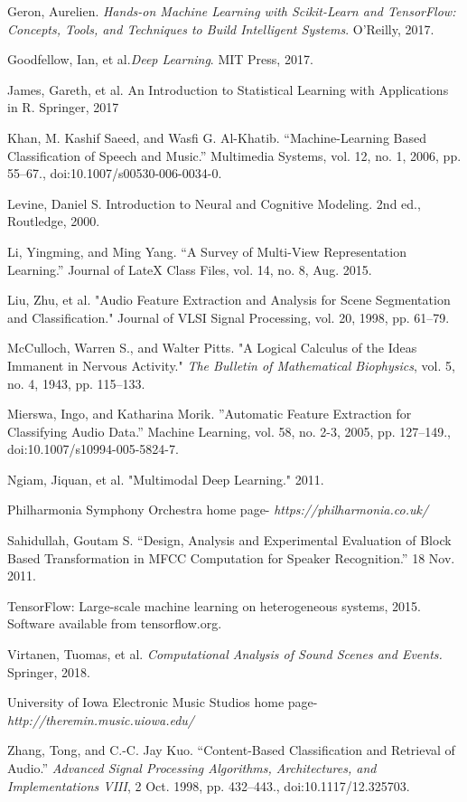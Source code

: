 \documentclass[conference,twocolumn,letterpaper]{IEEEtran}
\begin{document}
\begin{thebibliography}{9}

Geron, Aurelien. \textit{Hands-on Machine Learning with Scikit-Learn and TensorFlow: Concepts, Tools, and Techniques to Build Intelligent Systems}. O'Reilly, 2017.

Goodfellow, Ian, et al.\textit{Deep Learning}. MIT Press, 2017.

James, Gareth, et al. An Introduction to Statistical Learning with Applications in R. Springer, 2017

Khan, M. Kashif Saeed, and Wasfi G. Al-Khatib. “Machine-Learning Based Classification of Speech and Music.” Multimedia Systems, vol. 12, no. 1, 2006, pp. 55–67., doi:10.1007/s00530-006-0034-0.

Levine, Daniel S. Introduction to Neural and Cognitive Modeling. 2nd ed., Routledge, 2000.

Li, Yingming, and Ming Yang. “A Survey of Multi-View Representation Learning.” Journal of LateX Class Files, vol. 14, no. 8, Aug. 2015. 

Liu, Zhu, et al. "Audio Feature Extraction and Analysis for Scene Segmentation and Classification." Journal of VLSI Signal Processing, vol. 20, 1998, pp. 61–79.

McCulloch, Warren S., and Walter Pitts. "A Logical Calculus of the Ideas Immanent in Nervous Activity." \textit{The Bulletin of Mathematical Biophysics}, vol. 5, no. 4, 1943, pp. 115–133.

Mierswa, Ingo, and Katharina Morik. ”Automatic Feature Extraction for Classifying Audio Data.” Machine Learning, vol. 58, no. 2-3, 2005, pp. 127–149., doi:10.1007/s10994-005-5824-7.


Ngiam, Jiquan, et al. "Multimodal Deep Learning." 2011. 

Philharmonia Symphony Orchestra home page- \textit{https://philharmonia.co.uk/}

Sahidullah, Goutam S. “Design, Analysis and Experimental Evaluation of Block Based Transformation in MFCC Computation for Speaker Recognition.” 18 Nov. 2011.

TensorFlow: Large-scale machine learning on heterogeneous systems,
2015. Software available from tensorflow.org.

Virtanen, Tuomas, et al. \textit{Computational Analysis of Sound Scenes and Events.} Springer, 2018.

University of Iowa Electronic Music Studios home page- \textit{http://theremin.music.uiowa.edu/}

Zhang, Tong, and C.-C. Jay Kuo. “Content-Based Classification and Retrieval of Audio.” \textit{Advanced Signal Processing Algorithms, Architectures, and Implementations VIII}, 2 Oct. 1998, pp. 432–443., doi:10.1117/12.325703.

\end{thebibliography}

\end{document}
